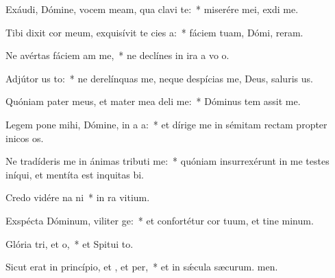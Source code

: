 \item Exáudi, Dómine, vocem meam, qua clavi  te:~* miserére mei,  exdi me.
\item Tibi dixit cor meum, exquisívit te cies a:~* fáciem tuam, Dómi, reram.
\item Ne avértas fáciem am  me,~* ne declínes in ira a vo o.
\item Adjútor us to:~* ne derelínquas me, neque despícias me, Deus, saluris us.
\item Quóniam pater meus, et mater mea deli me:~* Dóminus tem assit me.
\item Legem pone mihi, Dómine, in a a:~* et dírige me in sémitam rectam propter inicos os.
\item Ne tradíderis me in ánimas tributi me:~* quóniam insurrexérunt in me testes iníqui, et mentíta est inquitas bi.
\item Credo vidére na ni~* in ra vitium.
\item Exspécta Dóminum, viliter ge:~* et confortétur cor tuum, et tine minum.
\item Glória tri, et o,~* et Spitui to.
\item Sicut erat in princípio, et , et per,~* et in sǽcula sæcurum. men.
